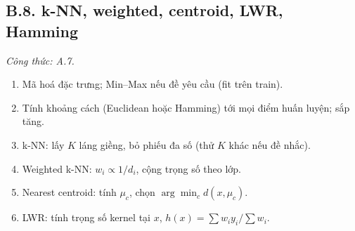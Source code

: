 \subsection*{B.8. k-NN, weighted, centroid, LWR, Hamming}
\textit{Công thức: A.7.}
\begin{enumerate}
  \item Mã hoá đặc trưng; Min--Max nếu đề yêu cầu (fit trên train).
  \item Tính khoảng cách (Euclidean hoặc Hamming) tới mọi điểm huấn luyện; sắp tăng.
  \item k-NN: lấy \(K\) láng giềng, bỏ phiếu đa số (thử \(K\) khác nếu đề nhắc).
  \item Weighted k-NN: \(w_i\propto 1/d_i\), cộng trọng số theo lớp.
  \item Nearest centroid: tính \(\mu_c\), chọn \(\arg\min_c d(x,\mu_c)\).
  \item LWR: tính trọng số kernel tại \(x\), \(h(x)=\sum w_i y_i/\sum w_i\).
\end{enumerate}
